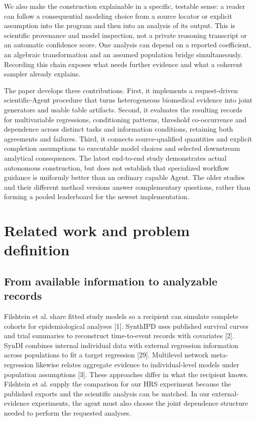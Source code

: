 \documentclass[11pt,letterpaper]{article}
\begin{document}
We also make the construction explainable in a specific, testable sense: a reader can follow a consequential modeling choice from a source locator or explicit assumption into the program and then into an analysis of its output. This is scientific provenance and model inspection, not a private reasoning transcript or an automatic confidence score. One analysis can depend on a reported coefficient, an algebraic transformation and an assumed population bridge simultaneously. Recording this chain exposes what needs further evidence and what a coherent sampler already explains.


The paper develops three contributions. First, it implements a request-driven scientific-Agent procedure that turns heterogeneous biomedical evidence into joint generators and usable table artifacts. Second, it evaluates the resulting records for multivariable regressions, conditioning patterns, threshold co-occurrence and dependence across distinct tasks and information conditions, retaining both agreements and failures. Third, it connects source-qualified quantities and explicit completion assumptions to executable model choices and selected downstream analytical consequences. The latest end-to-end study demonstrates actual autonomous construction, but does not establish that specialized workflow guidance is uniformly better than an ordinary capable Agent. The older studies and their different method versions answer complementary questions, rather than forming a pooled leaderboard for the newest implementation.


\section{Related work and problem definition}

\subsection{From available information to analyzable records}

Filshtein et al. share fitted study models so a recipient can simulate complete cohorts for epidemiological analyses [1]. SynthIPD uses published survival curves and trial summaries to reconstruct time-to-event records with covariates [2]. SynDI combines internal individual data with external regression information across populations to fit a target regression [29]. Multilevel network meta-regression likewise relates aggregate evidence to individual-level models under population assumptions [3]. These approaches differ in what the recipient knows. Filshtein et al. supply the comparison for our HRS experiment because the published exports and the scientific analysis can be matched. In our external-evidence experiments, the agent must also choose the joint dependence structure needed to perform the requested analyses.
\end{document}
